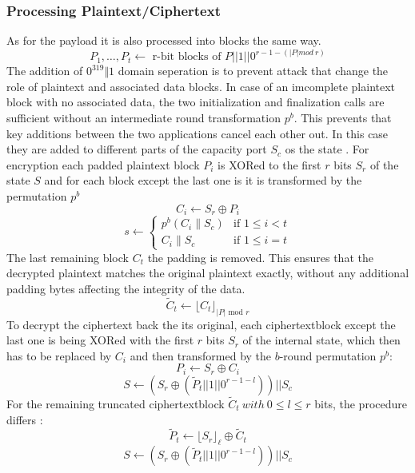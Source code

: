 \subsubsection{Processing Plaintext/Ciphertext}
As for the payload it is also processed into blocks the same way. 
$$P_1, \dots , P_t \leftarrow \text{ r-bit blocks of } P || 1 || 0^{r-1-(|P| mod\ r)}$$
The addition of $0^{319} \Vert 1$ domain seperation is to prevent attack that change the role of plaintext and associated data blocks. In case of an imcomplete plaintext block with no associated data, the two initialization and finalization calls are sufficient without an intermediate round transformation $p^b$. This prevents that key additions between the two applications cancel each other out. In this case they are added to different parts of the capacity port $S_c$ os the state \cite[Chapter 5.1.1]{DBLP:journals/joc/DobraunigEMS21}. \newline
For encryption each padded plaintext block $P_i$ is XORed to the first $r$ bits $S_r$ of the state $S$ and for each block except the last one is it is transformed by the permutation $p^b$%
$$C_i \leftarrow S_r \oplus P_i$$
$$
s \leftarrow \begin{cases} 
    p^b(C_i \parallel S_c) & \text{if } 1 \leq i < t \\
    C_i \parallel S_c & \text{if } 1 \leq i = t
    \end{cases}
$$
The last remaining block $C_t$ the padding is removed. This ensures that the decrypted plaintext matches the original plaintext exactly, without any additional padding bytes affecting the integrity of the data.
$$\tilde{C}_t \leftarrow \lfloor C_t \rfloor_{|P| \text{ mod } r}$$
\newline
To decrypt the ciphertext back the its original, each ciphertextblock except the last one is being XORed with the first $r$ bits $S_r$ of the internal state, which then has to be replaced by $C_i$ and then transformed by the $b$-round permutation $p^b$:
$$ P_i\leftarrow S_r \oplus C_i $$
$$ S \leftarrow (S_r \oplus (\tilde P_t || 1 || 0^{r-1-l})) || S_c $$
For the remaining truncated ciphertextblock $\tilde C_t\ with\ 0 \leq l \le r$ bits, the procedure differs \cite{DBLP:journals/joc/DobraunigEMS21}:
$$\tilde{P}_t \leftarrow \lfloor S_r \rfloor_\ell \oplus \tilde{C}_t$$
$$S \leftarrow (S_r \oplus (\tilde P_t || 1 || 0^{r-1-l})) || S_c$$

